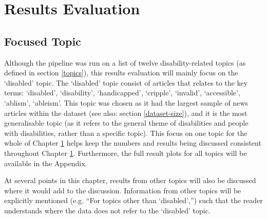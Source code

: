 \documentclass{report}
\begin{document}



\chapter{Results Evaluation} \label{Results Evaluation}  %

\section{Focused Topic} \label{Focused topic}
Although the pipeline was run on a list of twelve disability-related topics (as defined in section \ref{topics}), this results evaluation will mainly focus on the `disabled' topic.
The `disabled' topic consist of articles that relates to the key terms: `disabled', `disability', `handicapped', `cripple', `invalid', `accessible', `ablism', `ableism'.
This topic was chosen as it had the largest sample of news articles within the dataset (see also: section \ref{dataset-size}), and it is the most generalisable topic (as it refers to the general theme of disabilities and people with disabilities, rather than a specific topic).
This focus on one topic for the whole of Chapter \ref{Results Evaluation} helps keep the numbers and results being discussed consistent throughout Chapter \ref{Results Evaluation}.
Furthermore, the full result plots for all topics will be available in the Appendix.

At several points in this chapter, results from other topics will also be discussed where it would add to the discussion.
Information from other topics will be explicitly mentioned (e.g. ``For topics other than `disabled','') such that the reader understands where the data does not refer to the `disabled' topic.
\end{document}
